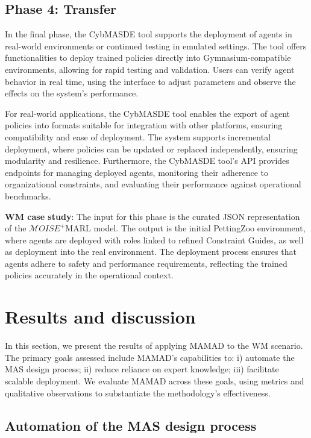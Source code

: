 \documentclass[pdflatex,sn-mathphys-num]{sn-jnl}%
\theoremstyle{thmstyleone}%
\theoremstyle{thmstyletwo}%
\theoremstyle{thmstylethree}%
\begin{document}
\subsection{Phase 4: Transfer}

In the final phase, the CybMASDE tool supports the deployment of agents in real-world environments or continued testing in emulated settings. The tool offers functionalities to deploy trained policies directly into Gymnasium-compatible environments, allowing for rapid testing and validation. Users can verify agent behavior in real time, using the interface to adjust parameters and observe the effects on the system's performance.

For real-world applications, the CybMASDE tool enables the export of agent policies into formats suitable for integration with other platforms, ensuring compatibility and ease of deployment. The system supports incremental deployment, where policies can be updated or replaced independently, ensuring modularity and resilience. Furthermore, the CybMASDE tool's API provides endpoints for managing deployed agents, monitoring their adherence to organizational constraints, and evaluating their performance against operational benchmarks.

\textbf{WM case study}: The input for this phase is the curated JSON representation of the $\mathcal{M}OISE^+$MARL model. The output is the initial PettingZoo environment, where agents are deployed with roles linked to refined Constraint Guides, as well as deployment into the real environment. The deployment process ensures that agents adhere to safety and performance requirements, reflecting the trained policies accurately in the operational context.



\section{Results and discussion}\label{sec:results}

In this section, we present the results of applying MAMAD to the WM scenario. The primary goals assessed include MAMAD's capabilities to: \quad i) automate the MAS design process; \quad ii) reduce reliance on expert knowledge; \quad iii) facilitate scalable deployment. We evaluate MAMAD across these goals, using metrics and qualitative observations to substantiate the methodology's effectiveness.

\subsection{Automation of the MAS design process}
\end{document}
